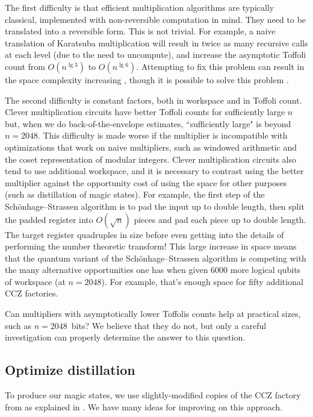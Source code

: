 \documentclass[a4paper, onecolumn, accepted=2021-03-29]{quantumarticle}
\begin{document}
The first difficulty is that efficient multiplication algorithms are typically classical, implemented with non-reversible computation in mind.
They need to be translated into a reversible form.
This is not trivial.
For example, a naive translation of Karatsuba multiplication will result in twice as many recursive calls at each level (due to the need to uncompute), and increase the asymptotic Toffoli count from $O(n^{\lg 3})$ to $O(n^{\lg 6})$.
Attempting to fix this problem can result in the space complexity increasing \cite{parent2017karatsuba}, though it is possible to solve this problem \cite{gidney2019karatsuba}.

The second difficulty is constant factors, both in workspace and in Toffoli count.
Clever multiplication circuits have better Toffoli counts for sufficiently large $n$ but, when we do back-of-the-envelope estimates, ``sufficiently large" is beyond $n=2048$.
This difficulty is made worse if the multiplier is incompatible with optimizations that work on naive multipliers, such as windowed arithmetic and the coset representation of modular integers.
Clever multiplication circuits also tend to use additional workspace, and it is necessary to contrast using the better multiplier against the opportunity cost of using the space for other purposes (such as distillation of magic states).
For example, the first step of the Schönhage–Strassen algorithm is to pad the input up to double length, then split the padded register into $O(\sqrt{n})$ pieces and pad each piece up to double length.
The target register quadruples in size before even getting into the details of performing the number theoretic transform!
This large increase in space means that the quantum variant of the Schönhage–Strassen algorithm is competing with the many alternative opportunities one has when given 6000 more logical qubits of workspace (at $n=2048$).
For example, that's enough space for fifty additional CCZ factories.

Can multipliers with asymptotically lower Toffolis counts help at practical sizes, such as $n=2048$~bits?
We believe that they do not, but only a careful investigation can properly determine the answer to this question.



\subsection{Optimize distillation}

To produce our magic states, we use slightly-modified copies of the CCZ factory from \cite{gidney2018magic} as explained in \cite{gidney2019autoccz}.
We have many ideas for improving on this approach.
\end{document}
